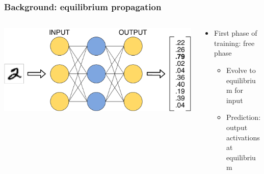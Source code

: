 \documentclass[pdf]{beamer}
\begin{document}
\begin{frame}
\frametitle{Background: equilibrium propagation}
\begin{columns}
	\begin{column}{.5\textwidth}
		\includegraphics[width=\textwidth]{figures/eqp_free_illustration.pdf}
	\end{column}
	\begin{column}{.5\textwidth}
		\begin{itemize}
			\item<1-> First phase of training: free phase
			\begin{itemize}
				\item<2-> Evolve to equilibrium for input
				\item<3-> Prediction: output activations at equilibrium
			\end{itemize}
		\end{itemize}
	\end{column}
\end{columns}
\end{frame}
\end{document}
